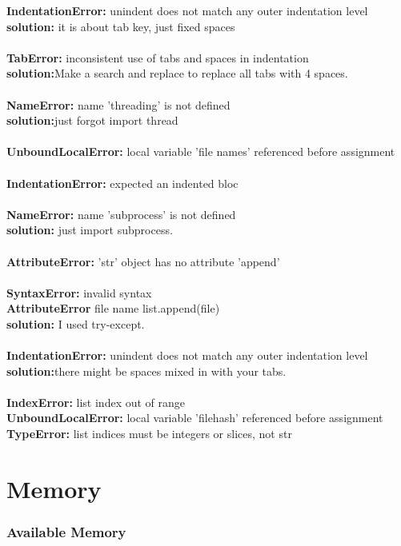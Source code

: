 \documentclass[onecolumn]{article}
\begin{document}
\textbf{IndentationError:} unindent does not match any outer indentation level \\   
\textbf{solution:} it is about tab key, just fixed spaces \\ \\
\textbf{TabError: }inconsistent use of tabs and spaces in indentation  \\
\textbf{solution:}Make a search and replace to replace all tabs with 4 spaces. \\ \\
\textbf{NameError:} name 'threading' is not defined \\
\textbf{solution:}just forgot import thread  \\ \\
\textbf{UnboundLocalError: }local variable 'file names' referenced before assignment \\ \\
\textbf{IndentationError:} expected an indented bloc \\\\
\textbf{NameError: }name 'subprocess' is not defined \\
\textbf{solution:} just import subprocess. \\ \\
\textbf{AttributeError:} 'str' object has no attribute 'append' \\ \\
\textbf{SyntaxError:} invalid syntax \\ 
 \textbf{AttributeError}  file name list.append(file) \\ 
 \textbf{solution:} I used try-except. \\ \\
 \textbf{IndentationError:} unindent does not match any outer indentation level
 \textbf{solution:}there might be spaces mixed in with your tabs. \\ \\ 
\textbf{ IndexError:} list index out of range \\ 
\textbf{UnboundLocalError:} local variable 'filehash' referenced before assignment \\ 
\textbf{TypeError: }list indices must be integers or slices, not str\\

\section{Memory}

\subsubsection{Available Memory  }
\end{document}
